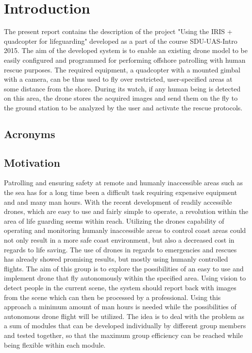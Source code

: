 \chapter*{Introduction}

The present report contains the description of the  project "Using the IRIS + quadcopter for lifeguarding" developed as a part of the course  SDU-UAS-Intro 2015. 
The aim of the developed system is to enable an existing drone model to be easily configured and programmed for performing offshore patrolling with human rescue purposes. 
The required equipment, a quadcopter with a mounted gimbal with a camera, can be thus used to fly over restricted, user-specified areas at some distance from the shore. 
During its watch, if any human being is detected on this area, the drone stores the acquired images and send them on the fly to the ground station to be analyzed by the user and activate the rescue protocols. 



\section*{Acronyms}
\begin{acronym}[AWGN]
\end{acronym}

\section*{Motivation}
Patrolling and ensuring safety at remote and humanly inaccessible areas such as the sea has for a long time been a difficult task requiring expensive equipment and and many man hours. 
With the recent development of readily accessible drones, which are easy to use and fairly simple to operate, a revolution within the area of life guarding seems within reach. 
Utilizing the drones capability of operating and monitoring humanly inaccessible areas to control coast areas could not only result in a more safe coast environment, but also a decreased cost in regards to life saving. 
The use of drones in regards to emergencies and rescues has already showed promising results, but mostly using humanly controlled flights.
The aim of this group is to explore the possibilities of an easy to use and implement drone that fly autonomously within the specified area. 
Using vision to detect people in the current scene, the system should report back with images from the scene which can then be processed by a professional.
Using this approach a minimum amount of man hours is needed while the possibilities of autonomous drone flight will be utilized.
The idea is to deal with the problem as a sum of modules that can be developed individually by different group members and tested together, so that the maximum group efficiency can be reached while being flexible within each module.




\newpage

